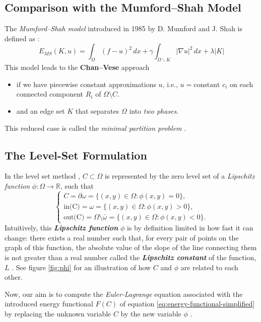 \documentclass[journal]{IEEEtran}
\newcommand{\bfit}[1]{\textbf{\textit{#1}}} %
\begin{document}
\subsection{Comparison with the Mumford--Shah Model}
The \emph{Mumford--Shah model} introduced in 1985 \cite{MumfordShah} by D. Mumford and J. Shah is defined as \cite{Pascal2023}:
\[
    E_{MS}(K, u) = \int_{\Omega} (f - u)^2 \, dx + \gamma \int_{\Omega \backslash K} |\nabla u|^2 \, dx + \lambda |K|
\]
This model leads to the \textbf{Chan--Vese} approach
\begin{itemize}
    \item if we have piecewise constant approximations $u$, i.e., $u = \text{constant } c_i$ on each connected component $R_i$ of $\Omega \setminus C$.
    \item and an edge set $K$ that separates $\Omega$ into \textit{two phases}.
\end{itemize}
This reduced case is called the \emph{minimal partition problem} \cite{ChanVese}.

\subsection{The Level-Set Formulation}\label{sec:level-set-formulation}
In the level set method \cite{Osher1988}, $C \subset \Omega$ is represented by the zero level set of a \emph{Lipschitz function} $\phi: \Omega \rightarrow \mathbb{R}$, such that
\[
    \begin{cases}
        C = \partial \omega = \{ (x, y) \in \Omega : \phi(x, y) = 0 \},     \\
        \textrm{in(C)} = \omega = \{ (x, y) \in \Omega : \phi(x, y) > 0 \}, \\
        \textrm{out(C)} = \Omega \setminus \bar{\omega} = \{ (x, y) \in \Omega : \phi(x, y) < 0 \}.
    \end{cases}
\]
Intuitively, this \bfit{Lipschitz function} $\phi$ is by definition limited in how fast it can change: there exists a real number such that, for every pair of points on the graph of this function, the absolute value of the slope of the line connecting them is not greater than a real number called the \bfit{Lipschitz constant} of the function, $L$ \cite{wiki:LipschitzContinuity}. See figure \ref{fig:phi} for an illustration of how $C$ and $\phi$ are related to each other.

Now, our aim is to compute the \emph{Euler-Lagrange} equation associated with the introduced energy functional $F(C)$ of equation \eqref{eq:energy-functional-simplified} by replacing the unknown variable $C$ by the new variable $\phi$ \cite{Zhao1996}.
\end{document}
